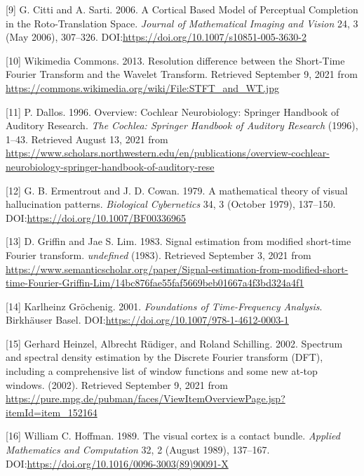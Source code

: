 \documentclass[american,]{article}
\theoremstyle{definition}
\theoremstyle{definition}
\theoremstyle{definition}
\theoremstyle{remark}
\begin{document}
\leavevmode\hypertarget{ref-citti2006}{}%
{[}9{]} G. Citti and A. Sarti. 2006. A Cortical Based Model of Perceptual Completion in the Roto-Translation Space. \emph{Journal of Mathematical Imaging and Vision} 24, 3 (May 2006), 307--326. DOI:\url{https://doi.org/10.1007/s10851-005-3630-2}

\leavevmode\hypertarget{ref-stft_vs_wt}{}%
{[}10{]} Wikimedia Commons. 2013. Resolution difference between the Short-Time Fourier Transform and the Wavelet Transform. Retrieved September 9, 2021 from \url{https://commons.wikimedia.org/wiki/File:STFT_and_WT.jpg}

\leavevmode\hypertarget{ref-dallos1996}{}%
{[}11{]} P. Dallos. 1996. Overview: Cochlear Neurobiology: Springer Handbook of Auditory Research. \emph{The Cochlea: Springer Handbook of Auditory Research} (1996), 1--43. Retrieved August 13, 2021 from \url{https://www.scholars.northwestern.edu/en/publications/overview-cochlear-neurobiology-springer-handbook-of-auditory-rese}

\leavevmode\hypertarget{ref-ermentrout1979}{}%
{[}12{]} G. B. Ermentrout and J. D. Cowan. 1979. A mathematical theory of visual hallucination patterns. \emph{Biological Cybernetics} 34, 3 (October 1979), 137--150. DOI:\url{https://doi.org/10.1007/BF00336965}

\leavevmode\hypertarget{ref-griffin1983}{}%
{[}13{]} D. Griffin and Jae S. Lim. 1983. Signal estimation from modified short-time Fourier transform. \emph{undefined} (1983). Retrieved September 3, 2021 from \url{https://www.semanticscholar.org/paper/Signal-estimation-from-modified-short-time-Fourier-Griffin-Lim/14bc876fae55faf5669beb01667a4f3bd324a4f1}

\leavevmode\hypertarget{ref-grochenig2001}{}%
{[}14{]} Karlheinz Gröchenig. 2001. \emph{Foundations of Time-Frequency Analysis}. Birkhäuser Basel. DOI:\url{https://doi.org/10.1007/978-1-4612-0003-1}

\leavevmode\hypertarget{ref-heinzel2002}{}%
{[}15{]} Gerhard Heinzel, Albrecht Rüdiger, and Roland Schilling. 2002. Spectrum and spectral density estimation by the Discrete Fourier transform (DFT), including a comprehensive list of window functions and some new at-top windows. (2002). Retrieved September 9, 2021 from \url{https://pure.mpg.de/pubman/faces/ViewItemOverviewPage.jsp?itemId=item_152164}

\leavevmode\hypertarget{ref-hoffman1989}{}%
{[}16{]} William C. Hoffman. 1989. The visual cortex is a contact bundle. \emph{Applied Mathematics and Computation} 32, 2 (August 1989), 137--167. DOI:\url{https://doi.org/10.1016/0096-3003(89)90091-X}
\end{document}
